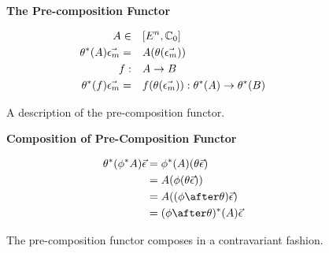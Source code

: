 \documentclass{Report}
\begin{document}
\begin{figure}
    \begin{framed}
        \centering
        \textbf{The Pre-composition Functor}

        \begin{align}
            A\in&\quad [E^n, \mathbb{C}_0]\\
            \theta^*(A) \vec{\epsilon_m} =&\quad  A(\theta(\vec{\epsilon_m}))\\
            f:&\quad A \rightarrow B\\
            \theta^*(f) \vec{\epsilon_m} =&\quad f(\theta(\vec{\epsilon_m})): \theta^*(A) \rightarrow \theta^*(B)\\
        \end{align}
    \end{framed}
    \caption{A description of the pre-composition functor.}
    \label{PrecompositionFunctor}
\end{figure}

\begin{figure}
    \begin{framed}
        \centering
        \textbf{Composition of Pre-Composition Functor}

        \begin{align}
            \theta\star(\phi\star A) \ev & = \phi\star(A)(\theta \ev)\\
            & = A(\phi(\theta\ev))\\
            & = A((\phi\after\theta) \ev)\\
            & = (\phi\after\theta)\star(A) \ev
        \end{align}
    \end{framed}

    \caption{The pre-composition functor composes in a contravariant fashion.}
    \label{PrecompositionFunctorComposition}
\end{figure}
\end{document}
